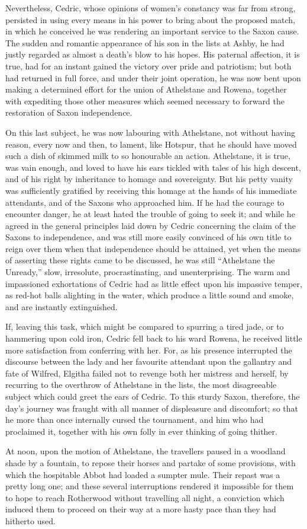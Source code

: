 Nevertheless, Cedric, whose opinions of women's constancy was far from
strong, persisted in using every means in his power to bring about the
proposed match, in which he conceived he was rendering an important
service to the Saxon cause. The sudden and romantic appearance of his
son in the lists at Ashby, he had justly regarded as almost a death's
blow to his hopes. His paternal affection, it is true, had for an
instant gained the victory over pride and patriotism; but both had
returned in full force, and under their joint operation, he was now bent
upon making a determined effort for the union of Athelstane and Rowena,
together with expediting those other measures which seemed necessary to
forward the restoration of Saxon independence.

On this last subject, he was now labouring with Athelstane, not without
having reason, every now and then, to lament, like Hotspur, that he
should have moved such a dish of skimmed milk to so honourable an
action. Athelstane, it is true, was vain enough, and loved to have his
ears tickled with tales of his high descent, and of his right by
inheritance to homage and sovereignty. But his petty vanity was
sufficiently gratified by receiving this homage at the hands of his
immediate attendants, and of the Saxons who approached him. If he had
the courage to encounter danger, he at least hated the trouble of going
to seek it; and while he agreed in the general principles laid down by
Cedric concerning the claim of the Saxons to independence, and was still
more easily convinced of his own title to reign over them when that
independence should be attained, yet when the means of asserting these
rights came to be discussed, he was still ``Athelstane the Unready,''
slow, irresolute, procrastinating, and unenterprising. The warm and
impassioned exhortations of Cedric had as little effect upon his
impassive temper, as red-hot balls alighting in the water, which produce
a little sound and smoke, and are instantly extinguished.

If, leaving this task, which might be compared to spurring a tired jade,
or to hammering upon cold iron, Cedric fell back to his ward Rowena, he
received little more satisfaction from conferring with her. For, as his
presence interrupted the discourse between the lady and her favourite
attendant upon the gallantry and fate of Wilfred, Elgitha failed not to
revenge both her mistress and herself, by recurring to the overthrow of
Athelstane in the lists, the most disagreeable subject which could greet
the ears of Cedric. To this sturdy Saxon, therefore, the day's journey
was fraught with all manner of displeasure and discomfort; so that he
more than once internally cursed the tournament, and him who had
proclaimed it, together with his own folly in ever thinking of going
thither.

At noon, upon the motion of Athelstane, the travellers paused in a
woodland shade by a fountain, to repose their horses and partake of some
provisions, with which the hospitable Abbot had loaded a sumpter mule.
Their repast was a pretty long one; and these several interruptions
rendered it impossible for them to hope to reach Rotherwood without
travelling all night, a conviction which induced them to proceed on
their way at a more hasty pace than they had hitherto used.
